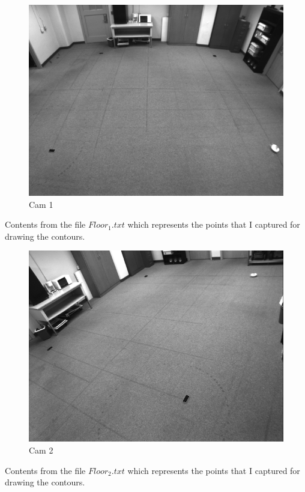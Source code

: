 \documentclass{article}
\begin{document}
\begin{enumerate}
\begin{figure}[!htb]
    \centering
  		\includegraphics[scale=0.5]{Background1.png}
  		\caption{ Cam 1\\}
  		\label{Fig9}
 \end{figure}
Contents from  the file $Floor_1.txt$ which represents the points that I captured for drawing the contours.


\newpage
\begin{figure}[!htb]
    \centering
  		\includegraphics[scale=0.5]{Background2.png}
  		\caption{ Cam 2\\}
  \end{figure}
Contents from  the file $Floor_2.txt$ which represents the points that I captured for drawing the contours.



\end{enumerate}
\end{document}
